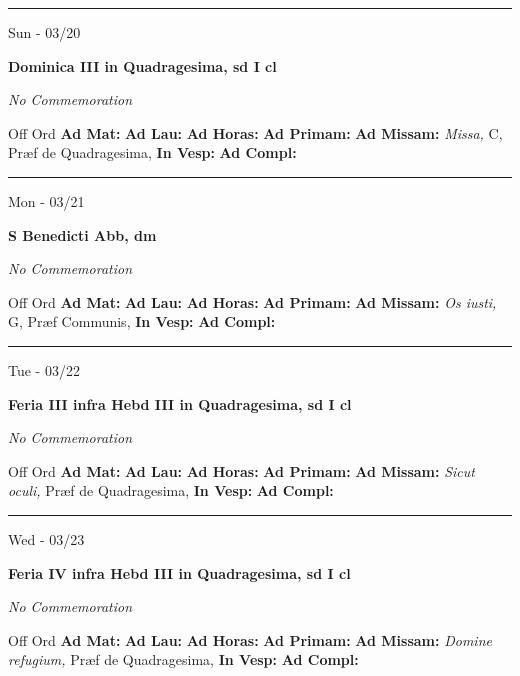 \documentclass[letterpaper, 10pt]{article}
\begin{document}
\hrule
\begin{center}
Sun - 03/20
\end{center}\textbf{ \large Dominica III in Quadragesima, \textnormal{\normalsize sd I cl}}

\textit{No Commemoration}\begin{justify}
Off Ord
\textbf{Ad Mat: }
\textbf{Ad Lau: }
\textbf{Ad Horas: }
\textbf{Ad Primam: }
\textbf{Ad Missam:} \textit{Missa, } C, Præf de Quadragesima, 
\textbf{In Vesp: }
\textbf{Ad Compl: }\end{justify}



\hrule
\begin{center}
Mon - 03/21
\end{center}\textbf{ \large S Benedicti Abb, \textnormal{\normalsize dm}}

\textit{No Commemoration}\begin{justify}
Off Ord
\textbf{Ad Mat: }
\textbf{Ad Lau: }
\textbf{Ad Horas: }
\textbf{Ad Primam: }
\textbf{Ad Missam:} \textit{Os iusti, } G, Præf Communis, 
\textbf{In Vesp: }
\textbf{Ad Compl: }\end{justify}



\hrule
\begin{center}
Tue - 03/22
\end{center}\textbf{ \large Feria III infra Hebd III in Quadragesima, \textnormal{\normalsize sd I cl}}

\textit{No Commemoration}\begin{justify}
Off Ord
\textbf{Ad Mat: }
\textbf{Ad Lau: }
\textbf{Ad Horas: }
\textbf{Ad Primam: }
\textbf{Ad Missam:} \textit{Sicut oculi, } Præf de Quadragesima, 
\textbf{In Vesp: }
\textbf{Ad Compl: }\end{justify}



\hrule
\begin{center}
Wed - 03/23
\end{center}\textbf{ \large Feria IV infra Hebd III in Quadragesima, \textnormal{\normalsize sd I cl}}

\textit{No Commemoration}\begin{justify}
Off Ord
\textbf{Ad Mat: }
\textbf{Ad Lau: }
\textbf{Ad Horas: }
\textbf{Ad Primam: }
\textbf{Ad Missam:} \textit{Domine refugium, } Præf de Quadragesima, 
\textbf{In Vesp: }
\textbf{Ad Compl: }\end{justify}
\end{document}
